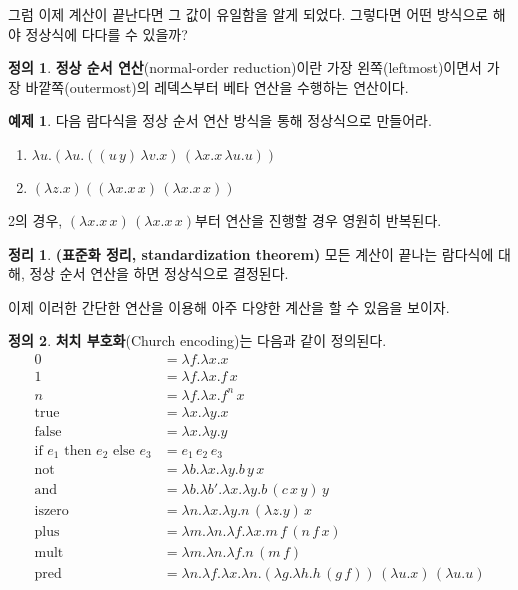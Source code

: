 \documentclass[b5paper]{book}
\theoremstyle{definition}
\newtheorem{defn}{정의}[chapter]
\newtheorem{thm}{정리}[chapter]
\newtheorem{ex}{예제}[chapter]
\begin{document}
그럼 이제 계산이 끝난다면 그 값이 유일함을 알게 되었다. 그렇다면 어떤 방식으로 해야 정상식에
다다를 수 있을까?
\begin{defn}
    \textbf{정상 순서 연산}(normal-order reduction)이란 가장 왼쪽(leftmost)이면서 가장 
    바깥쪽(outermost)의 레덱스부터 베타 연산을 수행하는 연산이다.
\end{defn}
\begin{ex}
    다음 람다식을 정상 순서 연산 방식을 통해 정상식으로 만들어라.
    \begin{enumerate}
        \item $\lambda u. (\lambda u. ((u \, y) \, \lambda v. x) \, (\lambda x. x \, \lambda u. u))$
        \item $(\lambda z. x) ((\lambda x . x \, x) \, (\lambda x. x \, x))$
    \end{enumerate}
    2의 경우, $(\lambda x . x \, x) \, (\lambda x. x \, x)$부터 연산을 진행할 경우 영원히 반복된다.
\end{ex}
\begin{thm}
    \textbf{(표준화 정리, standardization theorem)} 모든 계산이 끝나는 람다식에 대해, 
    정상 순서 연산을 하면 정상식으로 결정된다.
\end{thm}
이제 이러한 간단한 연산을 이용해 아주 다양한 계산을 할 수 있음을 보이자.
\begin{defn}
    \textbf{처치 부호화}(Church encoding)는 다음과 같이 정의된다.
    \begin{align*}
        0 &= \lambda f. \lambda x. x \\ 
        1 &= \lambda f. \lambda x. f \, x  \\ 
        n &= \lambda f. \lambda x. f^n \, x \\
        \text{true} &= \lambda x. \lambda y. x \\ 
        \text{false} &= \lambda x. \lambda y. y \\ 
        \text{if } e_1 \text{ then } e_2 \text { else } e_3 &=
        e_1 \, e_2 \, e_3 \\ 
        \text{not} &= \lambda b. \lambda x. \lambda y. b \, y \, x \\ 
        \text{and} &= \lambda b. \lambda b'. \lambda x. \lambda y.
        b \, (c \, x \, y) \, y\\
        \text{iszero} &= \lambda n. \lambda x. \lambda y. n \, (\lambda z. y) \, x \\
        \text{plus} &= \lambda m. \lambda n. \lambda f. \lambda x. m \, f \, (n\, f\, x) \\
        \text{mult} &= \lambda m. \lambda n. \lambda f. n \, (m \, f)  \\ 
        \text{pred} &= \lambda n. \lambda f. \lambda x. \lambda n. (\lambda g. \lambda h.
        h \, (g \, f)) \, (\lambda u. x) \, (\lambda u. u)
    \end{align*}
\end{defn}
\end{document}
